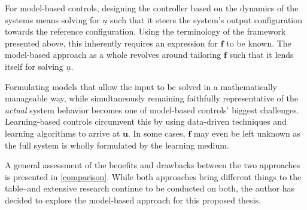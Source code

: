 

\begin{comment}
    The distinction between model- and learning-based control approaches may be described using the functional framework presented above. In both approaches, some input $\mathbf{u}$ is now introduced to the previously steady-state system. The system becomes \textit{closed}-loop when a controller that uses the system output to determine the control input is implemented (see \autoref{openvsclosed}). %
    In this scenario, $f(\mathbf{x,e,t,...})$ can be considered the controller. It functionally relates the system output/current state--and typically error $\mathbf{e}$ and time as well--to the control input. 
\end{comment}

% 

For model-based controls, designing the controller based on the dynamics of the systems means solving for $\underline{u}$ such that it steers the system's output configuration towards the reference configuration. Using the terminology of the framework presented above, this inherently requires an expression for $\mathbf{f}$ to be known. The model-based approach as a whole revolves around tailoring $\mathbf{f}$ such that it lends itself for solving $\underline{u}$. 
  
Formulating models that allow the input to be solved in a mathematically manageable way, while simultaneously remaining faithfully representative of the \textit{actual} system behavior becomes one of model-based controls' biggest challenges. Learning-based controls circumvent this by using data-driven techniques and learning algorithms to arrive at $\mathbf{u}$. In some cases, $\mathbf{f}$ may even be left unknown as the full system is wholly formulated by the learning medium.



A general assessment of the benefits and drawbacks between the two approaches is presented in \autoref{comparison}. While both approaches bring different things to the table--and extensive research continue to be conducted on both, the author has decided to explore the model-based approach for this proposed thesis.

